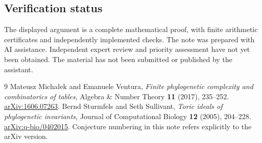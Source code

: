 \documentclass[11pt,a4paper]{article}
\begin{document}
\subsection*{Verification status}
The displayed argument is a complete mathematical proof, with finite
arithmetic certificates and independently implemented checks. The note
was prepared with AI assistance. Independent expert review and priority
assessment have not yet been obtained. The material has not been
submitted or published by the assistant.

\begin{thebibliography}{9}
Mateusz Micha\l ek and Emanuele Ventura,
\emph{Finite phylogenetic complexity and combinatorics of tables},
Algebra \& Number Theory \textbf{11} (2017), 235--252.
\href{https://arxiv.org/abs/1606.07263}{arXiv:1606.07263}.
Bernd Sturmfels and Seth Sullivant,
\emph{Toric ideals of phylogenetic invariants},
Journal of Computational Biology \textbf{12} (2005), 204--228.
\href{https://arxiv.org/abs/q-bio/0402015}{arXiv:q-bio/0402015}.
Conjecture numbering in this note refers explicitly to the arXiv version.
\end{thebibliography}
\end{document}
